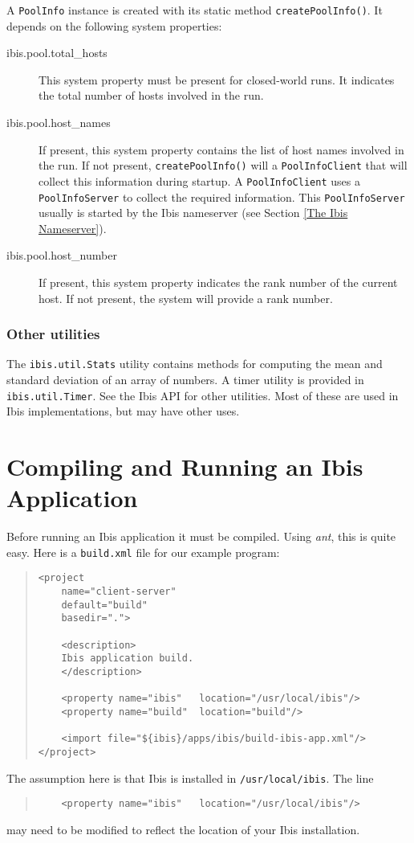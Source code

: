 \documentclass[10pt]{article}
\newcommand{\mysection}[1]{\section{#1}\label{#1}}
\newcommand{\mysubsubsection}[1]{\subsubsection{#1}\label{#1}}
\begin{document}
\noindent
A \texttt{PoolInfo} instance is created with its 
static method \texttt{createPoolInfo()}.
It depends on the following system properties:
\begin{description}
\item[ibis.pool.total\_hosts]
This system property must be present for closed-world runs.
It indicates the total number of hosts involved in the run.
\item[ibis.pool.host\_names]
If present, this system property contains the list of host names
involved in the run.
If not present, \texttt{createPoolInfo()} will a \texttt{PoolInfoClient}
that will collect this information during startup.
A \texttt{PoolInfoClient} uses a \texttt{PoolInfoServer} to collect the
required information.
This \texttt{PoolInfoServer} usually is started by the Ibis nameserver
(see Section \ref{The Ibis Nameserver}).

\item[ibis.pool.host\_number]
If present, this system property indicates the rank number of the
current host. If not present, the system will provide a rank number.
\end{description}

\mysubsubsection{Other utilities}

The \texttt{ibis.util.Stats} utility contains methods for computing
the mean and standard deviation of an array of numbers.
A timer utility is provided in \texttt{ibis.util.Timer}.
See the Ibis API for other utilities. Most of these are used in
Ibis implementations, but may have other uses.

\mysection{Compiling and Running an Ibis Application}

Before running an Ibis application it must be compiled.  Using
\emph{ant}, this is quite easy. Here is a \texttt{build.xml} file
for our example program:

\begin{quote}
\begin{verbatim}
<project
    name="client-server"
    default="build"
    basedir=".">

    <description>
    Ibis application build.
    </description>

    <property name="ibis"   location="/usr/local/ibis"/>
    <property name="build"  location="build"/>

    <import file="${ibis}/apps/ibis/build-ibis-app.xml"/>
</project>
\end{verbatim}
\end{quote}
The assumption here is that Ibis is installed in
\texttt{/usr/local/ibis}.
The line
\begin{quote}
\begin{verbatim}
    <property name="ibis"   location="/usr/local/ibis"/>
\end{verbatim}
\end{quote}
\noindent
may need to be modified to reflect the location of your Ibis
installation.
\end{document}
